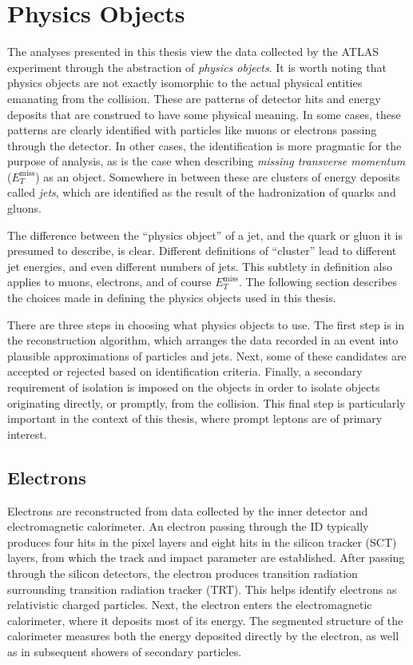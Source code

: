 \section{Physics Objects}\label{sec:physObjects}

The analyses presented in this thesis view the data collected by the ATLAS experiment through the abstraction of \emph{physics objects}.
It is worth noting that physics objects are not exactly isomorphic to the actual physical entities emanating from the collision.
These are patterns of detector hits and energy deposits that are construed to have some physical meaning.
In some cases, these patterns are clearly identified with particles like muons or electrons passing through the detector.
In other cases, the identification is more pragmatic for the purpose of analysis, as is the case when describing \emph{missing transverse momentum} ($E_T^\text{miss}$) as an object.
Somewhere in between these are clusters of energy deposits called \emph{jets}, which are identified as the result of the hadronization of quarks and gluons.

The difference between the ``physics object'' of a jet, and the quark or gluon it is presumed to describe, is clear.
Different definitions of ``cluster'' lead to different jet energies, and even different numbers of jets.
This subtlety in definition also applies to muons, electrons, and of course $E_T^\text{miss}$.
The following section describes the choices made in defining the physics objects used in this thesis.

There are three steps in choosing what physics objects to use.
The first step is in the reconstruction algorithm, which arranges the data recorded in an event into plausible approximations of particles and jets.
Next, some of these candidates are accepted or rejected based on identification criteria.
Finally, a secondary requirement of isolation is imposed on the objects in order to isolate objects originating directly, or promptly, from the collision.
This final step is particularly important in the context of this thesis, where prompt leptons are of primary interest.

\subsection{Electrons}
Electrons are reconstructed from data collected by the inner detector and electromagnetic calorimeter.
An electron passing through the ID typically produces four hits in the pixel layers and eight hits in the silicon tracker (SCT) layers, from which the track and impact parameter are established.
After passing through the silicon detectors, the electron produces transition radiation surrounding transition radiation tracker (TRT).
This helps identify electrons as relativistic charged particles.
Next, the electron enters the electromagnetic calorimeter, where it deposits most of its energy.
The segmented structure of the calorimeter measures both the energy deposited directly by the electron, as well as in subsequent showers of secondary particles.

